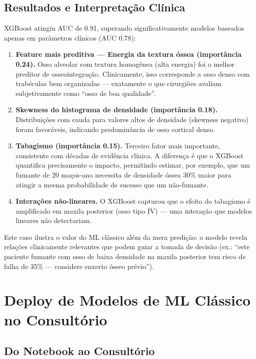 \subsection{Resultados e Interpretação Clínica}

XGBoost atingiu AUC de 0.91, superando significativamente modelos baseados apenas em parâmetros clínicos (AUC 0.78):

\begin{enumerate}
    \item \textbf{Feature mais preditiva — Energia da textura óssea (importância 0.24).} Osso alveolar com textura homogênea (alta energia) foi o melhor preditor de osseointegração. Clinicamente, isso corresponde a osso denso com trabéculas bem organizadas — exatamente o que cirurgiões avaliam subjetivamente como ``osso de boa qualidade''.
    
    \item \textbf{Skewness do histograma de densidade (importância 0.18).} Distribuições com cauda para valores altos de densidade (skewness negativo) foram favoráveis, indicando predominância de osso cortical denso.
    
    \item \textbf{Tabagismo (importância 0.15).} Terceiro fator mais importante, consistente com décadas de evidência clínica. A diferença é que o XGBoost quantifica precisamente o impacto, permitindo estimar, por exemplo, que um fumante de 20 maços-ano necessita de densidade óssea 30\% maior para atingir a mesma probabilidade de sucesso que um não-fumante.
    
    \item \textbf{Interações não-lineares.} O XGBoost capturou que o efeito do tabagismo é amplificado em maxila posterior (osso tipo IV) — uma interação que modelos lineares não detectariam.
\end{enumerate}

Este caso ilustra o valor do ML clássico além da mera predição: o modelo revela relações clinicamente relevantes que podem guiar a tomada de decisão (ex.: ``este paciente fumante com osso de baixa densidade na maxila posterior tem risco de falha de 35\% — considere enxerto ósseo prévio'').

\section{Deploy de Modelos de ML Clássico no Consultório}

\subsection{Do Notebook ao Consultório}

